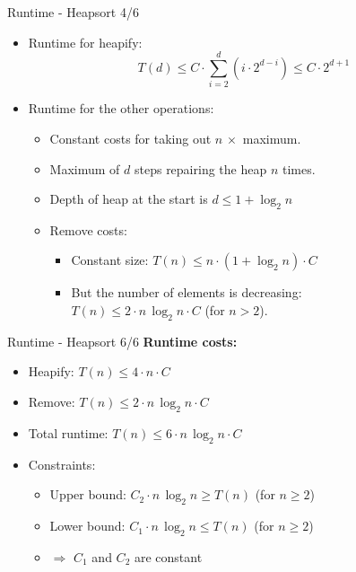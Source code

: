 \begin{frame}{Runtime - Heapsort 4/6}
  \begin{itemize}
    \item
      Runtime for heapify:
      \[\displaystyle
      T(d) \leq C \cdot \sum \limits^d_{i=2} \left(i \cdot 2^{d-i} \right)
      \leq C \cdot 2^{d + 1}\]
    \item
      Runtime for the other operations:
      \begin{itemize}
        \item
          Constant costs for taking out $n \, \times$ maximum.
        \item
          Maximum of $d$ steps repairing the heap $n$ times.
        \item
          Depth of heap at the start is $d \leq 1 + \log_2 n$
        \item
          Remove costs:
          \begin{itemize}
            \item
              Constant size:
              $T(n) \leq n \cdot (1 +\log_2 n) \cdot C$
            \item
              But the number of elements is decreasing:\\
              $T(n) \leq 2 \cdot n  \, \log_2 n \cdot C$ (for $n > 2$).
          \end{itemize}
      \end{itemize}
  \end{itemize}
\end{frame}


\begin{frame}{Runtime - Heapsort 6/6}
  \textbf{Runtime costs:}
  \begin{itemize}
    \item
      Heapify: $T(n) \leq 4 \cdot n \cdot C$
    \item
      Remove: $T(n) \leq 2 \cdot n \, \log_2 n \cdot C$
    \item
      Total runtime: $T(n) \leq 6 \cdot n \, \log_2 n \cdot C$
    \item
      Constraints:
      \begin{itemize}
        \item
          Upper bound:
          $C_2 \cdot n \, \log_2 n \geq T(n)$ (for $n \geq 2$)
        \item
          Lower bound:
          $C_1 \cdot n \, \log_2 n \leq T(n)$ (for $n \geq 2$)
        \item
          $\Rightarrow$ $C_1$ and $C_2$ are constant
      \end{itemize}
  \end{itemize}
\end{frame}

\setcounter{subsubsection}{0}